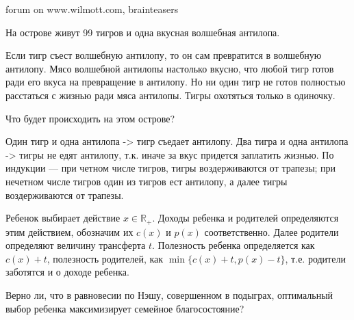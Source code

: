 \begin{problem}
\begin{source}
forum on www.wilmott.com, brainteasers
\end{source}
На острове живут 99 тигров и одна вкусная волшебная антилопа. \par
Если тигр съест волшебную антилопу, то он сам превратится в волшебную антилопу. Мясо волшебной антилопы настолько вкусно, что любой тигр готов ради его вкуса на превращение в антилопу. Но ни один тигр не готов полностью расстаться с жизнью ради мяса антилопы. Тигры охотяться только в одиночку.\par
Что будет происходить на этом острове? \par

\begin{sol}
 Один тигр и одна антилопа -> тигр съедает антилопу. Два тигра и одна антилопа -> тигры не едят антилопу, т.к. иначе за вкус придется заплатить жизнью. По индукции --- при четном числе тигров, тигры воздерживаются от трапезы; при нечетном числе тигров один из тигров ест антилопу, а далее тигры воздерживаются от трапезы.
\end{sol}
\end{problem}





\begin{problem}
 Ребенок выбирает действие $x\in \mathbb{R}_{+}$. Доходы ребенка и
родителей определяются этим действием, обозначим их $c(x)$ и
$p(x)$ соответственно. Далее родители определяют величину
трансферта $t$. Полезность ребенка определяется как $c(x)+t$,
полезность родителей, как $\min\{c(x)+t,p(x)-t\}$, т.е. родители
заботятся и о доходе ребенка. \par
Верно ли, что в равновесии по Нэшу, совершенном в подыграх,
оптимальный выбор ребенка максимизирует семейное благосостояние?



\begin{sol}

\end{sol}
\end{problem}



